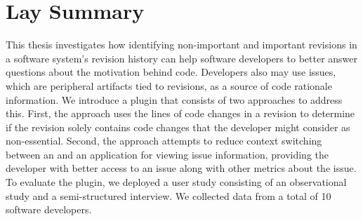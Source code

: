 

\chapter{Lay Summary}

This thesis investigates how identifying non-important and important 
revisions in a software system's revision history can help 
software developers to better answer questions about the motivation behind code.
Developers also may use issues, which are peripheral artifacts tied to revisions, 
as a source of code rationale information.
We introduce a plugin that consists of two approaches to address this.
First, the approach uses the lines of code changes in a revision
to determine if the revision solely contains code changes that the developer
might consider as non-essential.
Second, the approach attempts to reduce context switching between an 
and an application for viewing issue information, providing the developer with
better access to an issue along with other metrics about the issue.
To evaluate the plugin, we deployed a user study consisting of an
observational study and a semi-structured interview.
We collected data from a total of 10 software developers.